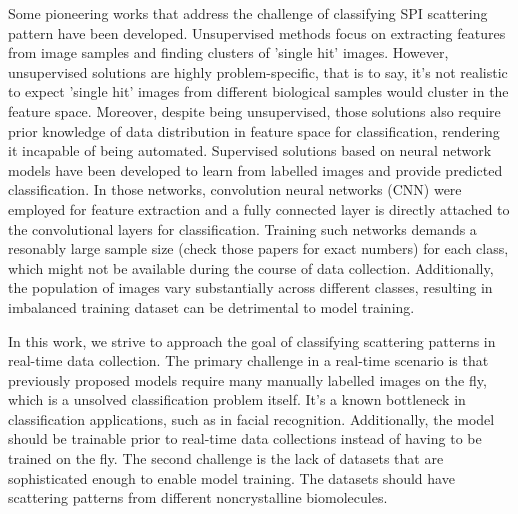 Some pioneering works that address the challenge of classifying SPI scattering
pattern have been developed.  Unsupervised methods
\cite{yoonUnsupervisedClassificationSingleparticle2011,
giannakisSymmetriesImageFormation2012,schwanderSymmetriesImageFormation2012,
yoonNovelAlgorithmsCoherent2012,
andreassonAutomatedIdentificationClassification2014,
bobkovSortingAlgorithmsSingleparticle2015} focus on extracting features from
image samples and finding clusters of 'single hit' images.  However,
unsupervised solutions are highly problem-specific, that is to say, it's not
realistic to expect 'single hit' images from different biological samples would
cluster in the feature space.  Moreover, despite being unsupervised, those
solutions also require prior knowledge of data distribution in feature space for
classification, rendering it incapable of being automated. Supervised solutions
based on neural network models \cite{shiEvaluationPerformanceClassification2019,
ignatenkoClassificationDiffractionPatterns2021} have been developed to learn
from labelled images and provide predicted classification.  In those networks,
convolution neural networks (CNN) were employed for feature extraction and a
fully connected layer is directly attached to the convolutional layers for
classification.  Training such networks demands a resonably large sample size
{\color{red}(check those papers for exact numbers)} for each class, which might
not be available during the course of data collection. Additionally, the
population of images vary substantially across different classes, resulting in
imbalanced training dataset can be detrimental to model training.  



In this work, we strive to approach the goal of classifying scattering patterns
in real-time data collection.  The primary challenge in a real-time scenario is
that previously proposed models require many manually labelled images on the fly,
which is a unsolved classification problem itself.  It's a known bottleneck in
classification applications, such as in facial recognition.  Additionally, the
model should be trainable prior to real-time data collections instead of having
to be trained on the fly. The second challenge is the lack of datasets that are
sophisticated enough to enable model training. The datasets should have
scattering patterns from different noncrystalline biomolecules.  



